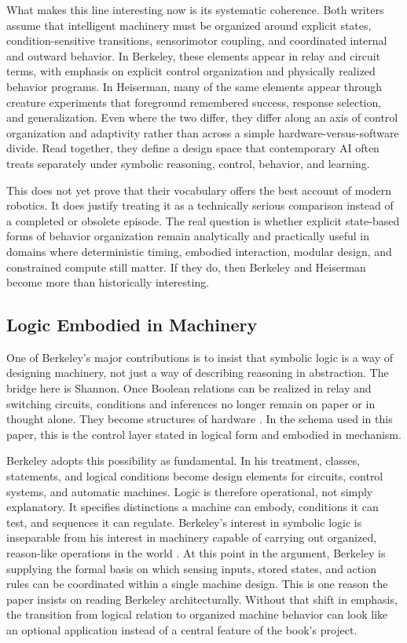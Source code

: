 \documentclass[11pt]{article}
\begin{document}
What makes this line interesting now is its systematic coherence. Both writers assume that intelligent machinery must be organized around explicit states, condition-sensitive transitions, sensorimotor coupling, and coordinated internal and outward behavior. In Berkeley, these elements appear in relay and circuit terms, with emphasis on explicit control organization and physically realized behavior programs. In Heiserman, many of the same elements appear through creature experiments that foreground remembered success, response selection, and generalization. Even where the two differ, they differ along an axis of control organization and adaptivity rather than across a simple hardware-versus-software divide. Read together, they define a design space that contemporary AI often treats separately under symbolic reasoning, control, behavior, and learning.

This does not yet prove that their vocabulary offers the best account of modern robotics. It does justify treating it as a technically serious comparison instead of a completed or obsolete episode. The real question is whether explicit state-based forms of behavior organization remain analytically and practically useful in domains where deterministic timing, embodied interaction, modular design, and constrained compute still matter. If they do, then Berkeley and Heiserman become more than historically interesting.

\subsection*{Logic Embodied in Machinery}

One of Berkeley's major contributions is to insist that symbolic logic is a way of designing machinery, not just a way of describing reasoning in abstraction. The bridge here is Shannon. Once Boolean relations can be realized in relay and switching circuits, conditions and inferences no longer remain on paper or in thought alone. They become structures of hardware \citep{shannon1938symbolic}. In the schema used in this paper, this is the control layer stated in logical form and embodied in mechanism.

Berkeley adopts this possibility as fundamental. In his treatment, classes, statements, and logical conditions become design elements for circuits, control systems, and automatic machines. Logic is therefore operational, not simply explanatory. It specifies distinctions a machine can embody, conditions it can test, and sequences it can regulate. Berkeley's interest in symbolic logic is inseparable from his interest in machinery capable of carrying out organized, reason-like operations in the world \citep{berkeley1959symbolic}. At this point in the argument, Berkeley is supplying the formal basis on which sensing inputs, stored states, and action rules can be coordinated within a single machine design. This is one reason the paper insists on reading Berkeley architecturally. Without that shift in emphasis, the transition from logical relation to organized machine behavior can look like an optional application instead of a central feature of the book's project.
\end{document}
